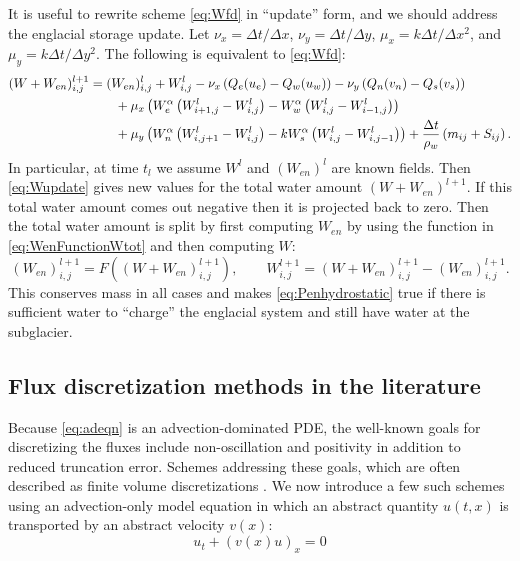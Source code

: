 \documentclass[11pt,final]{amsart}
\newcommand{\Wlij}{W^l_{i,j}}
\begin{document}
It is useful to rewrite scheme \eqref{eq:Wfd} in ``update'' form, and we should address the englacial storage update.  Let $\nu_x = \Delta t/\Delta x$, $\nu_y = \Delta t/\Delta y$, $\mu_x = k\Delta t/\Delta x^2$, and $\mu_y = k\Delta t/\Delta y^2$.  The following is equivalent to \eqref{eq:Wfd}:
\begin{align}
 (W+W_{en})_{i,j}^{l+1} &= (W_{en})_{i,j}^l + W_{i,j}^l - \nu_x \left(Q_e(u_e) - Q_w(u_w)\right) - \nu_y \left(Q_n(v_n) - Q_s(v_s)\right) \label{eq:Wupdate} \\
  &\qquad + \mu_x \left(W_e^\alpha \left(W_{i+1,j}^l - \Wlij\right) - W_w^\alpha \left(\Wlij - W_{i-1,j}^l\right)\right) \notag \\
  &\qquad + \mu_y \left(W_n^\alpha \left(W_{i,j+1}^l - \Wlij\right) - k W_s^\alpha \left(\Wlij - W_{i,j-1}^l\right)\right) + \frac{\Delta t}{\rho_w}\left(m_{ij}+S_{ij}\right). \notag
\end{align}
In particular, at time $t_l$ we assume $W^l$ and $(W_{en})^l$ are known fields.  Then \eqref{eq:Wupdate} gives new values for the total water amount $(W+W_{en})^{l+1}$.  If this total water amount comes out negative then it is projected back to zero.  Then the total water amount is split by first computing $W_{en}$ by using the function in \eqref{eq:WenFunctionWtot} and then computing $W$:
\begin{equation} (W_{en})_{i,j}^{l+1} = F\left((W+W_{en})_{i,j}^{l+1}\right), \qquad  W_{i,j}^{l+1} = (W+W_{en})_{i,j}^{l+1} - (W_{en})_{i,j}^{l+1}.  \label{eq:Wenupdate}
\end{equation}
This conserves mass in all cases and makes \eqref{eq:Penhydrostatic} true if there is sufficient water to ``charge'' the englacial system and still have water at the subglacier.

\subsection*{Flux discretization methods in the literature}  Because \eqref{eq:adeqn} is an advection-dominated PDE, the well-known goals for discretizing the fluxes include non-oscillation and positivity \citep{HundsdorferVerwer2010} in addition to reduced truncation error.  Schemes addressing these goals, which are often described as finite volume discretizations \citep{LeVeque}.  We now introduce a few such schemes using an advection-only model equation in which an abstract quantity $u(t,x)$ is transported by an abstract velocity $v(x)$:
\begin{equation} \label{eq:modeladvect}
u_t + (v(x) u)_x = 0
\end{equation}
\end{document}
